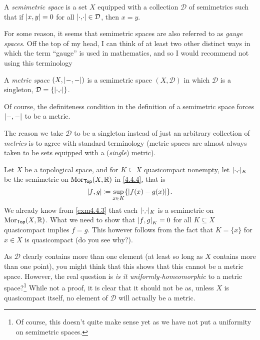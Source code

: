 \begin{dfn}\label{Semimetric space}
A \emph{semimetric space} is a set $X$ equipped with a collection $\mathcal{D}$ of semimetrics such that if $\metric[x][y]=0$ for all $\metric \in \mathcal{D}$, then $x=y$.
\begin{rmk}
For some reason, it seems that semimetric spaces are also referred to as \emph{gauge spaces}.  Off the top of my head, I can think of at least two other distinct ways in which the term ``gauge'' is used in mathematics, and so I would recommend not using this terminology
\end{rmk}
\end{dfn}
\begin{dfn}\label{MetricSpace}
A \emph{metric space} $(X,\lvert-,-\rvert)$ is a semimetric space $(X,\mathcal{D})$ in which $\mathcal{D}$ is a singleton, $\mathcal{D}=\{ \metric \}$.
\begin{rmk}
Of course, the definiteness condition in the definition of a semimetric space forces $\lvert-,-\rvert$ to be a metric.
\end{rmk}
\begin{rmk}
The reason we take $\mathcal{D}$ to be a singleton instead of just an arbitrary collection of \emph{metrics} is to agree with standard terminology (metric spaces are almost always taken to be sets equipped with a (\emph{single}) metric).
\end{rmk}
\end{dfn}
\begin{exm}
Let $X$ be a topological space, and for $K\subseteq X$ quasicompact nonempty, let $\metric _K$ be the semimetric on $\operatorname{Mor} _{\mathsf{Top}}(X,\mathbb{R} )$ in \eqref{4.4.4}, that is
\begin{equation}
\metric[f][g]\coloneqq \sup _{x\in K}\{ \abs{f(x)-g(x)}\} .
\end{equation}
We already know from \cref{exm4.4.3} that each $\metric _K$ is a semimetric on $\operatorname{Mor} _{\mathsf{Top}}(X,\mathbb{R} )$.  What we need to show that $\metric[f][g]_K=0$ for all $K\subseteq X$ quasicompact implies $f=g$.  This however follows from the fact that $K=\{ x\}$ for $x\in X$ is quasicompact (do you see why?).

As $\mathcal{D}$ clearly contains more than one element (at least so long as $X$ contains more than one point), you might think that this shows that this cannot be a metric space.  However, the real question is \emph{is it uniformly-homeomorphic} to a metric space?\footnote{Of course, this doesn't quite make sense yet as we have not put a uniformity on semimetric spaces.}  While not a proof, it is clear that it should not be as, unless $X$ is quasicompact itself, no element of $\mathcal{D}$ will actually be a metric.
\end{exm}

